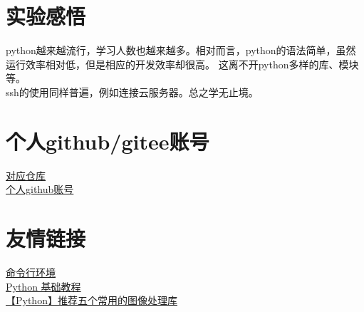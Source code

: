 \documentclass[UTF8]{ctexart}
\begin{document}
\section{实验感悟}
python越来越流行，学习人数也越来越多。相对而言，python的语法简单，虽然运行效率相对低，但是相应的开发效率却很高。
这离不开python多样的库、模块等。
\\
\indent ssh的使用同样普遍，例如连接云服务器。总之学无止境。

\section{个人github/gitee账号}
\href{https://github.com/sufwis/development-tools-learn.git}{对应仓库}
\\
\indent \href{https://github.com/sufwis}{个人github账号}

\section{友情链接}
\href{https://missing-semester-cn.github.io/2020/command-line/}{命令行环境}
\\
\indent \href{https://www.runoob.com/python/python-tutorial.html}{Python 基础教程}
\\
\indent \href{https://blog.csdn.net/sgzqc/article/details/124871774}{【Python】推荐五个常用的图像处理库}
\end{document}
